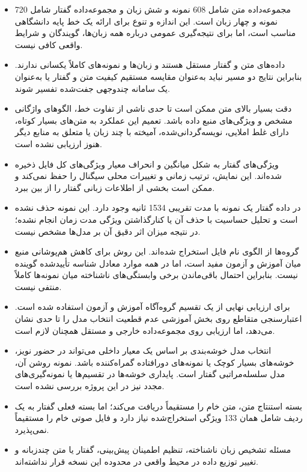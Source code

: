 \documentclass[12pt,a4paper,oneside]{report}
\begin{document}
\begin{itemize}
	\item مجموعه‌داده متن شامل 608 نمونه و شش زبان و مجموعه‌داده گفتار شامل 720 نمونه و چهار زبان است. این اندازه و تنوع برای ارائه یک خط پایه دانشگاهی مناسب است، اما برای نتیجه‌گیری عمومی درباره همه زبان‌ها، گویندگان و شرایط واقعی کافی نیست.

	\item داده‌های متن و گفتار مستقل هستند و زبان‌ها و نمونه‌های کاملاً یکسانی ندارند. بنابراین نتایج دو مسیر نباید به‌عنوان مقایسه مستقیم کیفیت متن و گفتار یا به‌عنوان یک سامانه چندوجهی جفت‌شده تفسیر شوند.

	\item دقت بسیار بالای متن ممکن است تا حدی ناشی از تفاوت خط، الگوهای واژگانی مشخص و ویژگی‌های منبع داده باشد. تعمیم این عملکرد به متن‌های بسیار کوتاه، دارای غلط املایی، نویسه‌گردانی‌شده، آمیخته با چند زبان یا متعلق به منابع دیگر هنوز ارزیابی نشده است.

	\item ویژگی‌های گفتار به شکل میانگین و انحراف معیار ویژگی‌های کل فایل ذخیره شده‌اند. این نمایش، ترتیب زمانی و تغییرات محلی سیگنال را حفظ نمی‌کند و ممکن است بخشی از اطلاعات زبانی گفتار را از بین ببرد.

	\item در داده گفتار یک نمونه با مدت تقریبی 1534 ثانیه وجود دارد. این نمونه حذف نشده است و تحلیل حساسیت با حذف آن یا کنارگذاشتن ویژگی مدت زمان انجام نشده؛ در نتیجه میزان اثر دقیق آن بر مدل‌ها مشخص نیست.

	\item گروه‌ها از الگوی نام فایل استخراج شده‌اند. این روش برای کاهش هم‌پوشانی منبع میان آموزش و آزمون مفید است، اما در همه موارد معادل شناسه تأییدشده گوینده نیست. بنابراین احتمال باقی‌ماندن برخی وابستگی‌های ناشناخته میان نمونه‌ها کاملاً منتفی نیست.

	\item برای ارزیابی نهایی از یک تقسیم گروه‌آگاه آموزش و آزمون استفاده شده است. اعتبارسنجی متقاطع روی بخش آموزشی عدم قطعیت انتخاب مدل را تا حدی نشان می‌دهد، اما ارزیابی روی مجموعه‌داده خارجی و مستقل همچنان لازم است.

	\item انتخاب مدل خوشه‌بندی بر اساس یک معیار داخلی می‌تواند در حضور نویز، خوشه‌های بسیار کوچک یا نمونه‌های دورافتاده گمراه‌کننده باشد. نمونه روشن آن، مدل سلسله‌مراتبی گفتار است. پایداری خوشه‌ها در تقسیم‌ها یا نمونه‌گیری‌های مجدد نیز در این پروژه بررسی نشده است.

	\item بسته استنتاج متن، متن خام را مستقیماً دریافت می‌کند؛ اما بسته فعلی گفتار به یک ردیف شامل همان 133 ویژگی استخراج‌شده نیاز دارد و فایل صوتی خام را مستقیماً نمی‌پذیرد.

	\item مسئله تشخیص زبان ناشناخته، تنظیم اطمینان پیش‌بینی، گفتار یا متن چندزبانه و تغییر توزیع داده در محیط واقعی در محدوده این نسخه قرار نداشته‌اند.
\end{itemize}
\end{document}
